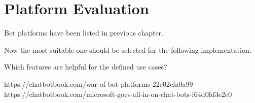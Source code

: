 \section{Platform Evaluation}

Bot platforms have been listed in previous chapter.

Now the most suitable one should be selected for the following implementation.

Which features are helpful for the defined use cases?


https://chatbotbook.com/war-of-bot-platforms-22e02cfa0a99
https://chatbotbook.com/microsoft-goes-all-in-on-chat-bots-f64d0fd3e2e0
